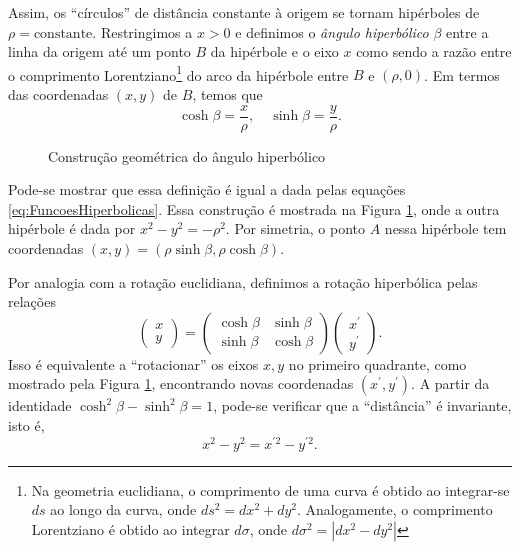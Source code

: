 Assim, os ``círculos'' de distância constante à origem se tornam hipérboles de $\rho=\text{constante}$. Restringimos a $x>0$ e definimos o \textit{ângulo hiperbólico} $\beta$ entre a linha da origem até um ponto $B$ da hipérbole e o eixo $x$ como sendo a razão entre o comprimento Lorentziano\footnote{Na geometria euclidiana, o comprimento de uma curva é obtido ao integrar-se $ds$ ao longo da curva, onde $ds^2=dx^2+dy^2$. Analogamente, o comprimento Lorentziano é obtido ao integrar $d\sigma$, onde $d\sigma^2=|dx^2-dy^2|$} do arco da hipérbole entre $B$ e $(\rho,0)$. Em termos das coordenadas $(x,y)$ de $B$, temos que
\begin{equation}\label{eq:AnguloHiperbolico}
    \cosh\beta = \frac{x}{\rho} ,\quad
    \sinh\beta = \frac{y}{\rho} .
\end{equation}

\begin{figure}[t]
    \centering
    \caption{Construção geométrica do ângulo hiperbólico}
    \label{fig:Hiperbole}
\end{figure}

Pode-se mostrar que essa definição é igual a dada pelas equações \eqref{eq:FuncoesHiperbolicas}. Essa construção é mostrada na Figura \ref{fig:Hiperbole}, onde a outra hipérbole é dada por $x^2-y^2=-\rho^2$. Por simetria, o ponto $A$ nessa hipérbole tem coordenadas $(x,y) = (\rho\sinh\beta,\rho\cosh\beta)$.

Por analogia com a rotação euclidiana, definimos a rotação hiperbólica pelas relações
\begin{equation}\label{eq:RotacaoHiperbolica}
\left(\begin{array}{l}{x} \\ {y}\end{array}\right)=\left(\begin{array}{ll}{\cosh \beta} & {\sinh \beta} \\ {\sinh \beta} & {\cosh \beta}\end{array}\right)\left(\begin{array}{l}{x^{\prime}} \\ {y^{\prime}}\end{array}\right) .
\end{equation}
Isso é equivalente a ``rotacionar'' os eixos $x, y$ no primeiro quadrante, como mostrado pela Figura \ref{fig:Hiperbole}, encontrando novas coordenadas $(x^\prime,y^\prime)$. A partir da identidade $\cosh^2\beta-\sinh^2\beta=1$, pode-se verificar que a ``distância'' é invariante, isto é,
\begin{equation}\label{eq:InvarianciaDistanciaHiperbolica}
    x^2-y^2=x^{\prime2}-y^{\prime 2} .
\end{equation}


